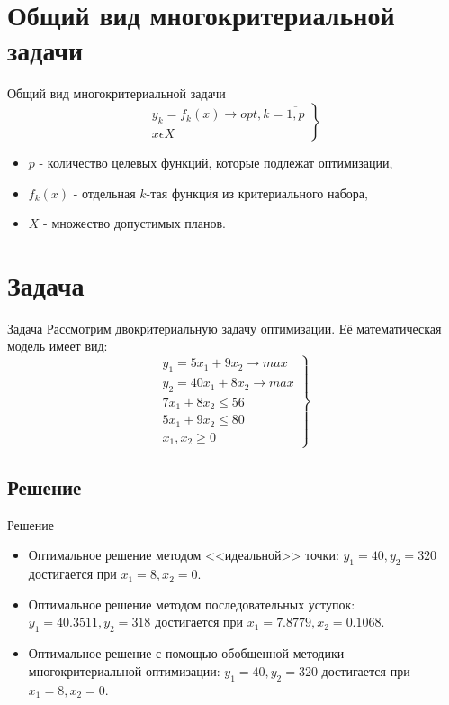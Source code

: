 \documentclass[xcolor=table]{beamer}
\begin{document}
\section{Общий вид многокритериальной задачи}
\begin{frame}{Общий вид многокритериальной задачи}
$$
\left.\begin{matrix}
y_{k} = f_{k}\left ( x \right )\rightarrow opt, k =\overline{1,p}
\\x\epsilon  X
\end{matrix}\right\}$$
\begin{itemize}
\item[] $p$ - количество целевых функций, которые подлежат оптимизации,
\item[] $f_{k}\left ( x \right )$ - отдельная $k$-тая функция из критериального набора,
\item[] $X$ - множество допустимых планов.
\end{itemize}
\end{frame}


\section{Задача}
\begin{frame}{Задача}
\hspace{0.7cm} Рассмотрим двокритериальную задачу оптимизации. Её математическая модель имеет вид:
$$
\left.\begin{matrix}
y_{1} = 5x_{1} + 9x_{2} \rightarrow max
\\ y_{2} = 40x_{1} + 8x_{2} \rightarrow max
\\ 7x_{1} + 8x_{2}\leq 56
\\5x_{1} + 9x_{2} \leq 80
\\x_{1},x_{2}\geq 0
\end{matrix}\right\}
$$
\end{frame}

\subsection{Решение}
\begin{frame}{Решение}
\begin{itemize}
\item Оптимальное решение методом <<идеальной>> точки: $y_{1} = 40, y_{2} = 320$ достигается при $x_{1} = 8, x_{2} = 0$.
\item Оптимальное решение методом последовательных уступок:  $y_{1} = 40.3511, y_{2} = 318$ достигается при $x_{1} = 7.8779, x_{2} = 0.1068$.
\item Оптимальное решение с помощью обобщенной методики многокритериальной оптимизации: $y_{1} = 40, y_{2} = 320$ достигается при $x_{1} = 8, x_{2} = 0$.
\end{itemize}
\end{frame}
\end{document}

